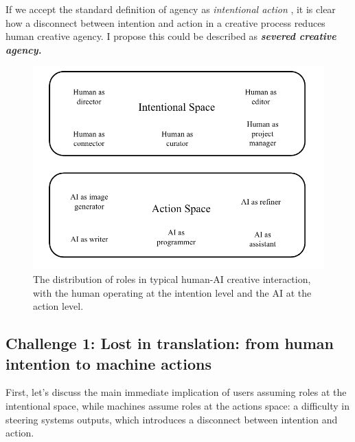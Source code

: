 If we accept the standard definition of agency as \textit{intentional action} \cite{Schlosser2019-jk}, it is clear how a disconnect between intention and action in a creative process reduces human creative agency. I propose this could be described as \textbf{\textit{severed creative agency.}}

\begin{figure}[H]
    \centering
    \includegraphics[width=0.75\linewidth]{roles.png}
    \caption{The distribution of roles in typical human-AI creative interaction, with the human operating at the intention level and the AI at the action level.}
    \label{fig:roles-in-spaces}
\end{figure}




\subsection{Challenge 1: Lost in translation: from human intention to machine actions}

First, let's discuss the main immediate implication of users assuming roles at the intentional space, while machines assume roles at the actions space: a difficulty in steering systems outputs, which introduces a disconnect between intention and action. 

